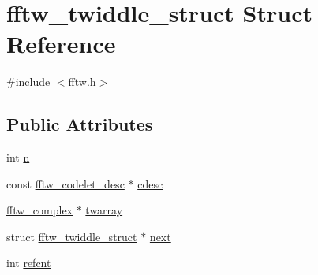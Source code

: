 \hypertarget{structfftw__twiddle__struct}{\section{fftw\-\_\-twiddle\-\_\-struct Struct Reference}
\label{structfftw__twiddle__struct}
}


{\ttfamily \#include $<$fftw.\-h$>$}

\subsection*{Public Attributes}
\begin{DoxyCompactItemize}
\item 
int \hyperlink{structfftw__twiddle__struct_a1ef8adb93bb61bac933d4b59c8031087}{n}
\item 
const \hyperlink{structfftw__codelet__desc}{fftw\-\_\-codelet\-\_\-desc} $\ast$ \hyperlink{structfftw__twiddle__struct_a54bdb5f494d6265576fbcedc9b8bc513}{cdesc}
\item 
\hyperlink{structfftw__complex}{fftw\-\_\-complex} $\ast$ \hyperlink{structfftw__twiddle__struct_ac9d49fa830d0e0e59de456bb4a614fe4}{twarray}
\item 
struct \hyperlink{structfftw__twiddle__struct}{fftw\-\_\-twiddle\-\_\-struct} $\ast$ \hyperlink{structfftw__twiddle__struct_a6bb8fd55d4b24190d2899f753ef94eaf}{next}
\item 
int \hyperlink{structfftw__twiddle__struct_ab6c2135b5ccb5c2941b0e48eeb10cd08}{refcnt}
\end{DoxyCompactItemize}


